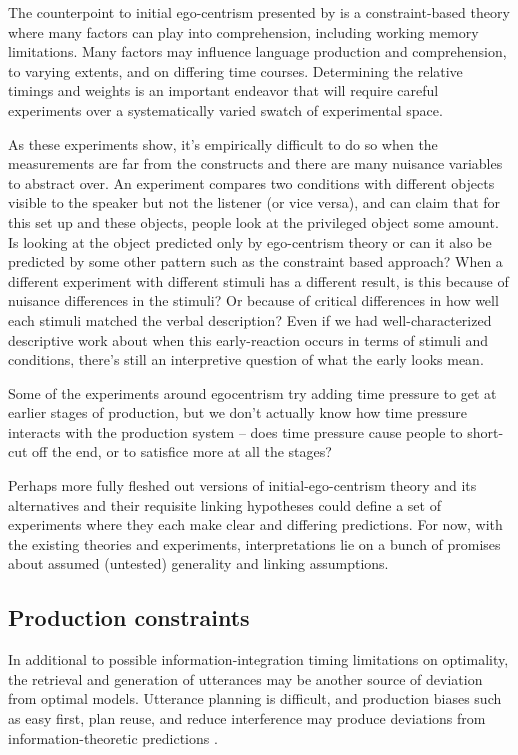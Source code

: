 \documentclass[]{article}
\begin{document}
The counterpoint to initial ego-centrism presented by \citet{hanna2003} is a constraint-based theory where many factors can play into comprehension, including working memory limitations. Many factors may influence language production and comprehension, to varying extents, and on differing time courses. Determining the relative timings and weights is an important endeavor that will require careful experiments over a systematically varied swatch of experimental space.  

As these experiments show, it's empirically difficult to do so when the measurements are far from the constructs and there are many nuisance variables to abstract over. An experiment compares two conditions with different objects visible to the speaker but not the listener (or vice versa), and can claim that for this set up and these objects, people look at the privileged object some amount. Is looking at the object predicted only by ego-centrism theory or can it also be predicted by some other pattern such as the constraint based approach? When a different experiment with different stimuli has a different result, is this because of nuisance differences in the stimuli? Or because of critical differences in how well each stimuli matched the verbal description? Even if we had well-characterized descriptive work about when this early-reaction occurs in terms of stimuli and conditions, there's still an interpretive question of what the early looks mean. 

Some of the experiments around egocentrism try adding time pressure to get at earlier stages of production, but we don't actually know how time pressure interacts with the production system -- does time pressure cause people to short-cut off the end, or to satisfice more at all the stages? 

Perhaps more fully fleshed out versions of initial-ego-centrism theory and its alternatives and their requisite linking hypotheses could define a set of experiments where they each make clear and differing predictions. For now, with the existing theories and experiments, interpretations lie on a bunch of promises about assumed (untested) generality and linking assumptions. 


\subsection{Production constraints}
In additional to possible information-integration timing limitations on optimality, the retrieval and generation of utterances may be another source of deviation from optimal models. Utterance planning is difficult, and production biases such as easy first, plan reuse, and reduce interference may produce deviations from information-theoretic predictions \citep{macdonald2013}.
\end{document}
